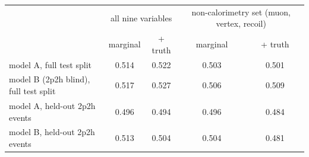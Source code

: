 \begin{tabular}{lcccc}
\toprule
 & \multicolumn{2}{c}{all nine variables} & \multicolumn{2}{c}{non-calorimetry set (muon, vertex, recoil)} \\
 & marginal & + truth & marginal & + truth \\
\midrule
model A, full test split & 0.514 & 0.522 & 0.503 & 0.501 \\
model B (2p2h blind), full test split & 0.517 & 0.527 & 0.506 & 0.509 \\
model A, held-out 2p2h events & 0.496 & 0.494 & 0.496 & 0.484 \\
model B, held-out 2p2h events & 0.513 & 0.504 & 0.504 & 0.481 \\
\bottomrule
\end{tabular}
